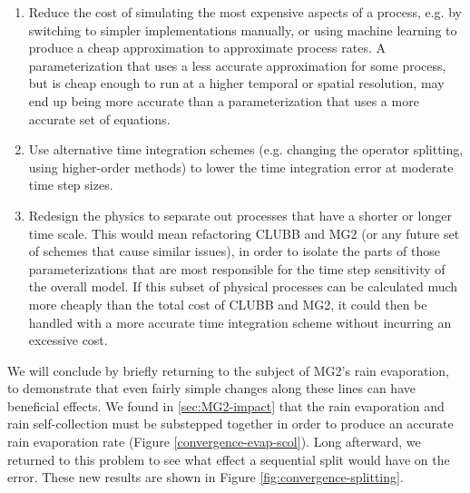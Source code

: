 \documentclass [11pt, proquest] {uwthesis}[2020/02/24]
\begin{document}
\begin{enumerate}
    \item Reduce the cost of simulating the most expensive aspects of a process, e.g. by switching to simpler implementations manually, or using machine learning to produce a cheap approximation to approximate process rates. A parameterization that uses a less accurate approximation for some process, but is cheap enough to run at a higher temporal or spatial resolution, may end up being more accurate than a parameterization that uses a more accurate set of equations.
    \item Use alternative time integration schemes (e.g. changing the operator splitting, using higher-order methods) to lower the time integration error at moderate time step sizes.
    \item Redesign the physics to separate out processes that have a shorter or longer time scale. This would mean refactoring CLUBB and MG2 (or any future set of schemes that cause similar issues), in order to isolate the parts of those parameterizations that are most responsible for the time step sensitivity of the overall model. If this subset of physical processes can be calculated much more cheaply than the total cost of CLUBB and MG2, it could then be handled with a more accurate time integration scheme without incurring an excessive cost.
\end{enumerate}

We will conclude by briefly returning to the subject of MG2's rain evaporation, to demonstrate that even fairly simple changes along these lines can have beneficial effects. We found in \ref{sec:MG2-impact} that the rain evaporation and rain self-collection must be substepped together in order to produce an accurate rain evaporation rate (Figure \ref{convergence-evap-scol}). Long afterward, we returned to this problem to see what effect a sequential split would have on the error. These new results are shown in Figure \ref{fig:convergence-splitting}.
\end{document}
